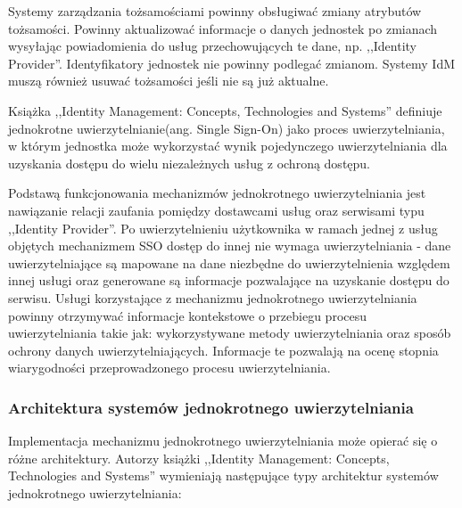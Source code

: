 		Systemy zarządzania tożsamościami powinny obsługiwać zmiany atrybutów tożsamości. Powinny aktualizować informacje o danych jednostek po zmianach wysyłając powiadomienia do usług przechowujących te dane, np. ,,Identity Provider''. Identyfikatory jednostek nie powinny podlegać zmianom. Systemy IdM muszą również usuwać tożsamości jeśli nie są już aktualne.


	Książka ,,Identity Management: Concepts, Technologies and Systems'' definiuje jednokrotne uwierzytelnianie(ang. Single Sign-On) jako proces uwierzytelniania, w którym jednostka może wykorzystać wynik pojedynczego uwierzytelniania dla uzyskania dostępu do wielu niezależnych usług z ochroną dostępu\cite{Bertino11}. 

	Podstawą funkcjonowania mechanizmów jednokrotnego uwierzytelniania jest nawiązanie relacji zaufania pomiędzy dostawcami usług oraz serwisami typu ,,Identity Provider''. Po uwierzytelnieniu użytkownika w ramach jednej z usług objętych mechanizmem SSO dostęp do innej nie wymaga uwierzytelniania - dane uwierzytelniające są mapowane na dane niezbędne do uwierzytelnienia względem innej usługi oraz generowane są informacje pozwalające na uzyskanie dostępu do serwisu. Usługi korzystające z mechanizmu jednokrotnego uwierzytelniania powinny otrzymywać informacje kontekstowe o przebiegu procesu uwierzytelniania takie jak: wykorzystywane metody uwierzytelniania oraz sposób ochrony danych uwierzytelniających. Informacje te pozwalają na ocenę stopnia wiarygodności przeprowadzonego procesu uwierzytelniania.

	\subsubsection{Architektura systemów jednokrotnego uwierzytelniania}

		Implementacja mechanizmu jednokrotnego uwierzytelniania może opierać się o różne architektury. Autorzy książki ,,Identity Management: Concepts, Technologies and Systems''\cite{Bertino11} wymieniają następujące typy architektur systemów jednokrotnego uwierzytelniania:

